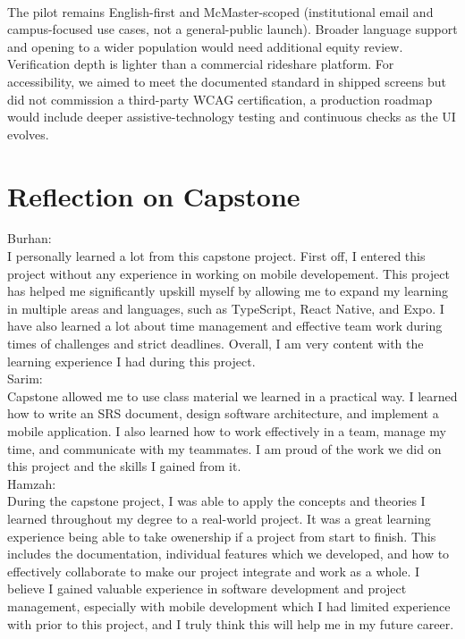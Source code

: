 \documentclass{article}
\begin{document}
\\
The pilot remains English-first and McMaster-scoped (institutional email and campus-focused use cases, not a general-public launch). Broader language support and opening to a wider population would need additional equity review. Verification depth is lighter than a commercial rideshare platform. For accessibility, we aimed to meet the documented standard in shipped screens but did not commission a third-party WCAG certification, a production roadmap would include deeper assistive-technology testing and continuous checks as the UI evolves.

\section{Reflection on Capstone}

Burhan: \\
I personally learned a lot from this capstone project.
First off, I entered this project without any experience in working on mobile developement. 
This project has helped me significantly upskill myself by allowing me to expand my learning 
in multiple areas and languages, such as TypeScript, React Native, and Expo.
I have also learned a lot about time management and effective team work during times of challenges and strict deadlines.
Overall, I am very content with the learning experience I had during this project.
\\
Sarim: \\
Capstone allowed me to use class material we learned in a practical way. 
I learned how to write an SRS document, design software architecture, and implement a mobile application.
I also learned how to work effectively in a team, manage my time, and communicate with my teammates.
I am proud of the work we did on this project and the skills I gained from it.
\\
Hamzah: \\
During the capstone project, I was able to apply the concepts and theories I learned throughout my degree to a real-world project. 
It was a great learning experience being able to take owenership if a project from start to finish. This includes the documentation, individual features which we developed, and how to effectively collaborate to make our project integrate and work as a whole.
I believe I gained valuable experience in software development and project management, especially with mobile development which I had limited experience with prior to this project, and I truly think this will help me in my future career.
\end{document}
